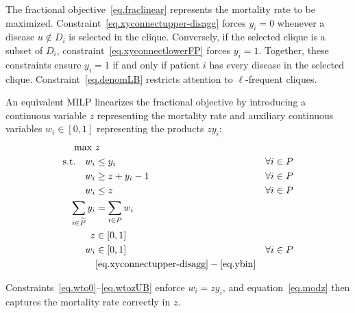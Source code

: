 The fractional objective~\eqref{eq.fraclinear} represents the
mortality rate to be maximized.
Constraint~\eqref{eq.xyconnectupper-disagg} forces $y_i = 0$ whenever
a disease $u \notin D_i$ is selected in the clique. Conversely, if
the selected clique is a subset of $D_i$,
constraint~\eqref{eq.xyconnectlowerFP} forces $y_i = 1$. Together,
these constraints ensure $y_i = 1$ if and only if patient $i$ has
every disease in the selected clique.
Constraint~\eqref{eq.denomLB} restricts attention to $\ell$-frequent
cliques.

An equivalent MILP linearizes the fractional
objective by introducing a continuous variable $z$ representing the
mortality rate and auxiliary continuous variables $w_i \in [0,1]$
representing the products $z y_i$:
\begin{subequations}\label{form.milp}
\begin{align}
  \max\ & z \label{eq.milpobj} \\
  \text{s.t.}\quad
  w_i &\le y_i & \forall i \in P \label{eq.wto0} \\
  w_i &\ge z + y_i - 1 & \forall i \in P \label{eq.wtozLB} \\
  w_i &\le z & \forall i \in P \label{eq.wtozUB} \\
  \sum_{i \in \widetilde{P}} y_i &= \sum_{i \in P} w_i
  \label{eq.modz} \\
  z &\in [0,1] \label{eq.zbound} \\
  w_i &\in [0,1] & \forall i \in P \label{eq.wbound} \\
  \nonumber&\eqref{eq.xyconnectupper-disagg}-\eqref{eq.ybin}
\end{align}
\end{subequations}

Constraints~\eqref{eq.wto0}--\eqref{eq.wtozUB} enforce $w_i = z
y_i$, and equation~\eqref{eq.modz} then captures the mortality rate
correctly in $z$.

